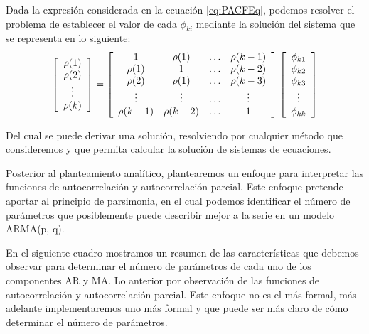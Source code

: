 \documentclass[
]{book}
\begin{document}
Dada la expresión considerada en la ecuación \eqref{eq:PACFEq}, podemos resolver el problema de establecer el valor de cada \(\phi_{ki}\) mediante la solución del sistema que se representa en lo siguiente:
\begin{equation}
    \left[ 
    \begin{array}{c}
        \rho(1) \\
        \rho(2) \\
        \vdots \\
        \rho(k)
    \end{array} 
    \right]
    = 
    \left[ 
    \begin{array}{c c c c}
        1 & \rho(1) & \ldots & \rho(k - 1)\\
        \rho(1) & 1 & \ldots & \rho(k - 2)\\
        \rho(2) & \rho(1) & \ldots & \rho(k - 3)\\
        \vdots & \vdots & \ldots & \vdots\\
        \rho(k - 1) & \rho(k - 2) & \ldots & 1\\
    \end{array} 
    \right]
    \left[ 
    \begin{array}{c}
        \phi_{k1} \\
        \phi_{k2} \\
        \phi_{k3} \\
        \vdots \\
        \phi_{kk} \\
    \end{array} 
    \right]
\end{equation}

Del cual se puede derivar una solución, resolviendo por cualquier método que consideremos y que permita calcular la solución de sistemas de ecuaciones.

Posterior al planteamiento analítico, plantearemos un enfoque para interpretar las funciones de autocorrelación y autocorrelación parcial. Este enfoque pretende aportar al principio de parsimonia, en el cual podemos identificar el número de parámetros que posiblemente puede describir mejor a la serie en un modelo ARMA(p, q).

En el siguiente cuadro mostramos un resumen de las características que debemos observar para determinar el número de parámetros de cada uno de los componentes AR y MA. Lo anterior por observación de las funciones de autocorrelación y autocorrelación parcial. Este enfoque no es el más formal, más adelante implementaremos uno más formal y que puede ser más claro de cómo determinar el número de parámetros.
\end{document}
